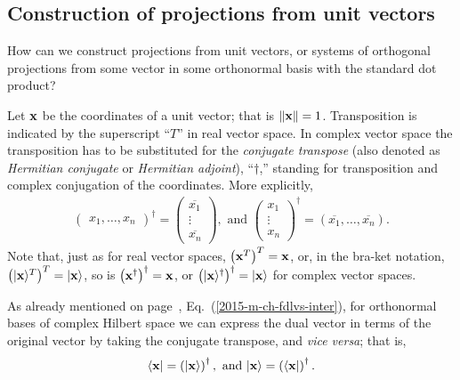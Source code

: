 \subsection{Construction of projections from unit vectors}

How can we construct projections from unit vectors, or systems of orthogonal projections from some vector in some orthonormal basis
with the standard dot product?

Let ${\bf x}$ be the coordinates of a unit vector;
that is $\|{\bf x} \| =1$.
Transposition is indicated by the superscript ``$T$''
in real vector space.
In complex vector space the transposition has to be substituted
 for the {\em conjugate transpose} (also denoted as
{\em Hermitian conjugate} or {\em Hermitian adjoint}),
``$\dagger$,'' standing for transposition and complex conjugation of the coordinates.
More explicitly,
\begin{equation}
\begin{split}
\begin{pmatrix}x_1,\ldots, x_n\end{pmatrix}^\dagger =
\begin{pmatrix}
\overline{x_1}\\ \vdots\\ \overline{x_n}
\end{pmatrix}
,  \textrm{ and }
\begin{pmatrix}
x_1\\ \vdots\\ x_n
\end{pmatrix}^\dagger
= (\overline{x_1},\ldots, \overline{x_n})
.
\end{split}
\end{equation}
Note that, just as for real vector spaces,
$\left({\bf x}^T\right)^T={\bf x}$,
or, in the bra-ket notation,
$\left(\vert {\bf x}\rangle^T\right)^T=\vert {\bf x}\rangle$,
 so is
$\left({\bf x}^\dagger \right)^\dagger={\bf x}$,
or
$\left(\vert  {\bf x}\rangle ^\dagger \right)^\dagger= \vert{\bf x} \rangle$ for complex vector spaces.

As already mentioned on page~\pageref{2015-m-ch-fdlvs-inter}, Eq.~(\ref{2015-m-ch-fdlvs-inter}), for orthonormal bases of complex Hilbert space
we can express the dual vector in terms of the original vector by
taking the conjugate transpose, and {\em vice versa}; that is,
\begin{equation}
\begin{split}
\langle {\bf x} \vert = \left(\vert {\bf x}\rangle \right)^\dagger,
\textrm{ and }
\vert {\bf x}\rangle  = \left(\langle {\bf x}\vert\right)^\dagger.
\end{split}
\end{equation}

